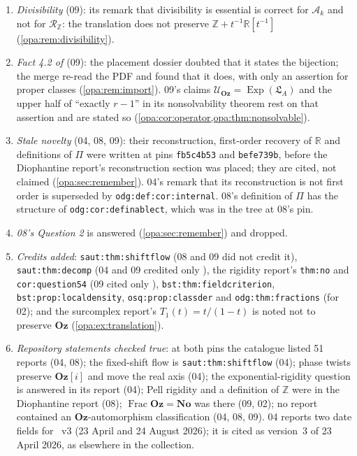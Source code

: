 \documentclass[11pt,oneside]{article}
\numberwithin{equation}{section}
\theoremstyle{definition}
\theoremstyle{remark}
\newcommand{\No}{\mathbf{No}}
\newcommand{\Oz}{\mathbf{Oz}}
\newcommand{\Og}{\mathbf{Oz}[i]}
\newcommand{\R}{\mathbb R}
\newcommand{\Z}{\mathbb Z}
\newcommand{\Ak}{\mathcal A_k}
\newcommand{\LL}{\mathfrak L}
\newcommand{\UU}{\mathcal U}
\newcommand{\Exp}{\operatorname{Exp}}
\newcommand{\Frac}{\operatorname{Frac}}
\newcommand{\lbl}[1]{\nolinkurl{#1}}
\begin{document}
\begin{enumerate}[itemsep=2pt]
\item \emph{Divisibility} (09): its remark that divisibility is essential is correct for
$\Ak$ and not for $\mathcal R_\Z$: the translation does not preserve
$\Z+t^{-1}\R[t^{-1}]$ (\cref{opa:rem:divisibility}).
\item \emph{Fact 4.2 of \cite{KKS}} (09): the placement dossier doubted that it states
the bijection; the merge re-read the PDF and found that it does, with only an assertion
for proper classes (\cref{opa:rem:import}). 09's claims $\UU_\Oz=\Exp(\LL_A)$ and the
upper half of ``exactly $r-1$'' in its nonsolvability theorem rest on that assertion
and are stated so (\cref{opa:cor:operator,opa:thm:nonsolvable}).
\item \emph{Stale novelty} (04, 08, 09): their reconstruction, first-order recovery of
$\R$ and definitions of $\Pi$ were written at pins \texttt{fb5c4b53} and
\texttt{befe739b}, before the Diophantine report's reconstruction section was placed;
they are cited, not claimed (\cref{opa:sec:remember}). 04's remark that its
reconstruction is not first order is superseded by \lbl{odg:def:cor:internal}. 08's
definition of $\Pi$ has the structure of \lbl{odg:cor:definablect}, which was in the tree
at 08's pin.
\item \emph{08's Question 2} is answered (\cref{opa:sec:remember}) and dropped.
\item \emph{Credits added}: \lbl{saut:thm:shiftflow} (08 and 09 did not credit it),
\lbl{saut:thm:decomp} (04 and 09 credited only \cite{KS}), the rigidity report's
\lbl{thm:no} and \lbl{cor:question54} (09 cited only \cite[Proposition 5.2]{KKS}),
\lbl{bst:thm:fieldcriterion}, \lbl{bst:prop:localdensity}, \lbl{osq:prop:classder} and
\lbl{odg:thm:fractions} (for 02); and the surcomplex report's $T_1(t)=t/(1-t)$ is noted
not to preserve $\Oz$ (\cref{opa:ex:translation}).
\item \emph{Repository statements checked true}: at both pins the catalogue listed 51
reports (04, 08); the fixed-shift flow is \lbl{saut:thm:shiftflow} (04); phase twists
preserve $\Og$ and move the real axis (04); the exponential-rigidity question is answered
in its report (04); Pell rigidity and a definition of $\Z$ were in the Diophantine report
(08); $\Frac\Oz=\No$ was there (09, 02); no report contained an $\Oz$-automorphism
classification (04, 08, 09). 04 reports two date fields for \cite{KKS}~v3 (23 April and
24 August 2026); it is cited as version~3 of 23 April 2026, as elsewhere in the
collection.

\end{enumerate}
\end{document}
